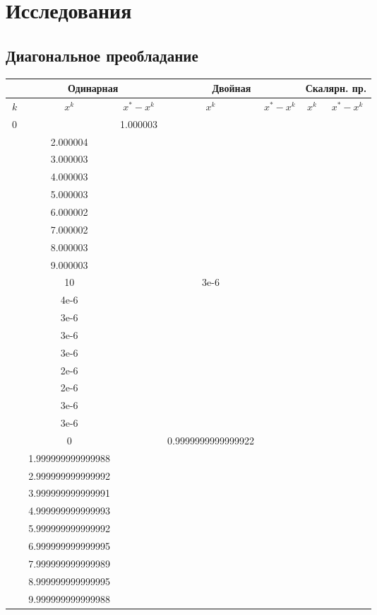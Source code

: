 \documentclass[oneside, final, 12pt]{extarticle}
\begin{document}
\section{Исследования}
\subsection{Диагональное преобладание}
\begin{longtable}{|c|c|c|c|c|c|c|} \hline
    \( \begin{aligned}  \end{aligned} \) & \multicolumn{2}{|c|}{Одинарная} & \multicolumn{2}{|c|}{Двойная} & \multicolumn{2}{|c|}{Скалярн. пр.} \\ \hline
    \(k\) & \(x^k\) & \(x^*-x^k\) & \(x^k\) & \(x^*-x^k\) & \(x^k\) & \(x^*-x^k\) \\ \hline
    \(0\) & \( \begin{aligned}
& 1.000003 \\ & 2.000004 \\ & 3.000003 \\ & 4.000003 \\ & 5.000003 \\ & 6.000002 \\ & 7.000002 \\ & 8.000003 \\ & 9.000003 \\ & 10 
\end{aligned} \)
& \( \begin{aligned} & 3e-6 \\ & 4e-6 \\ & 3e-6 \\ & 3e-6 \\ & 3e-6 \\ & 2e-6 \\ & 2e-6 \\ & 3e-6 \\ & 3e-6 \\ & 0 \end{aligned} \) 
& \( \begin{aligned}
& 0.9999999999999922 \\ & 1.999999999999988 \\ & 2.999999999999992 \\ & 3.999999999999991 \\ & 4.999999999999993 \\ & 5.999999999999992 \\ & 6.999999999999995 \\ & 7.999999999999989 \\ & 8.999999999999995 \\ & 9.999999999999988 

\end{aligned}
\end{longtable}
\end{document}
